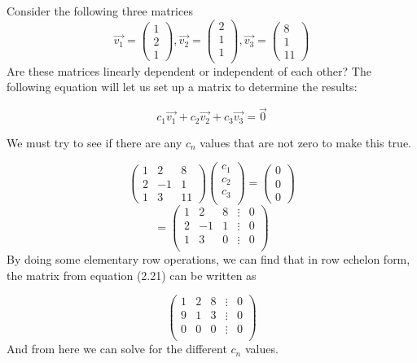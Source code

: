   \begin{problem}
    Consider the following three matrices
    \[
      \vec{v_1}=\begin{pmatrix}
        1\\2\\1
      \end{pmatrix}
      ,\vec{v_2}=\begin{pmatrix}
        2\\1\\1\\
      \end{pmatrix}
      ,\vec{v_3}=\begin{pmatrix}
        8\\1\\11
      \end{pmatrix}
    \]
    Are these matrices linearly dependent or independent of each other? The following equation will let us set up a matrix to determine the results:

    \[
      c_1\vec{v_1}+c_2\vec{v_2}+c_3\vec{v_3}=\vec{0}
    \]

    We must try to see if there are any $c_n$ values that are not zero to make this true.

    \[
      \begin{pmatrix}
        1&2&8\\2&-1&1\\1&3&11
      \end{pmatrix}
      \begin{pmatrix}
        c_1\\c_2\\c_3\\
      \end{pmatrix}
      =\begin{pmatrix}
        0\\0\\0
      \end{pmatrix}
    \]
    \[
      = \begin{pmatrix}
        1&2&8&\vdots&0\\
        2&-1&1&\vdots&0\\
        1&3&0&\vdots&0\\
      \end{pmatrix}
    \]
    By doing some elementary row operations, we can find that in row echelon form, the matrix from equation (2.21) can be written as

    \[
      \begin{pmatrix}
        1&2&8&\vdots&0\\
        9&1&3&\vdots&0\\
        0&0&0&\vdots&0\\
      \end{pmatrix}
    \]
    And from here we can solve for the different $c_n$ values.


\end{problem}
